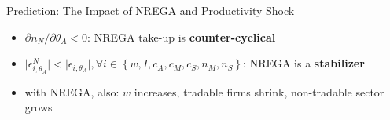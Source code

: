     \begin{frame}{Prediction: The Impact of NREGA and Productivity Shock}
        \begin{itemize}
            \item $\partial n_N/\partial \theta_A <0$: NREGA take-up is \textcolor{mygreen}{\textbf{counter-cyclical}}
            \item $\lvert \epsilon^N_{i,\theta_A} \rvert < \lvert \epsilon_{i,\theta_A} \rvert,\forall i \in\left\{w,I,c_A,c_M,c_S,n_M,n_S\right\}$: NREGA is a \textcolor{mygreen}{\textbf{stabilizer}}
            \item<2-> with NREGA, also: $w$ increases, tradable firms shrink, non-tradable sector grows
        \end{itemize}
        
    \end{frame}
